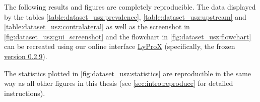 \begin{tcolorbox}[
    title=\faIcon{recycle} Reproducibility,
    parbox=false,
    float
]
    The following results and figures are completely reproducible. The data displayed by the tables \cref{table:dataset_usz:prevalence}, \cref{table:dataset_usz:upstream} and \cref{table:dataset_usz:contralateral} as well as the screenshot in \cref{fig:dataset_usz:gui_screenshot} and the flowchart in \cref{fig:dataset_usz:flowchart} can be recreated using our online interface \href{https://lyprox.org}{ LyProX} (specifically, the frozen \href{https://2021-oropharynx.lyprox.org}{ version 0.2.9}).
    
    The statistics plotted in \cref{fig:dataset_usz:statistics} are reproducible in the same way as all other figures in this thesis (see \cref{sec:intro:reproduce} for detailed instructions).
\end{tcolorbox}
